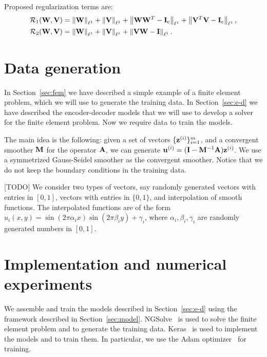 Proposed regularization terms are:
\begin{subequations}
    \begin{align}
        \mathcal{R}_1(\mathbf{W}, \mathbf{V}) &
        = \left\lVert \mathbf{W}  \right\rVert_{\ell^1} + \left\lVert \mathbf{V}  \right\rVert_{\ell^1}
        + \left\lVert \mathbf{W} \mathbf{W}^T - \mathbf{I}_\mathrm{c}  \right\rVert_{\ell^1}
        + \left\lVert \mathbf{V}^T \mathbf{V} - \mathbf{I}_\mathrm{c}  \right\rVert_{\ell^1}, \\
        \mathcal{R}_2(\mathbf{W}, \mathbf{V}) &
        = \left\lVert \mathbf{W}  \right\rVert_{\ell^1} + \left\lVert \mathbf{V}  \right\rVert_{\ell^1}
        + \left\lVert \mathbf{V} \mathbf{W} - \mathbf{I}  \right\rVert_{\ell^1}.
    \end{align}
\end{subequations}

\section{Data generation}

In Section~\ref{sec:fem} we have described a simple example of a finite element problem, which we will use to generate the training data.
In Section~\ref{sec:e-d} we have described the encoder-decoder models that we will use to develop a solver for the finite element problem.
Now we require data to train the models.

The main idea is the following: given a set of vectors \( \{ \mathbf{z}^{(i)} \}_{i=1}^{m} \), and a convergent smoother \( \mathbf{M}\) for the operator \(\mathbf{A}\), we can generate \( \mathbf{u}^{(i)} = (\mathbf{I} - \mathbf{M}^{-1} \mathbf{A}) \mathbf{z}^{(i)} \).
We use a symmetrized Gauss-Seidel smoother as the convergent smoother.
Notice that we do not keep the boundary conditions in the training data.

[TODO]
We consider two types of vectors, say randomly generated vectors with entries in \([0,1]\), vectors with entries in \(\{0,1\}\), and interpolation of smooth functions.
The interpolated functions are of the form \(u_i(x,y) = \sin(2 \pi \alpha_i x) \sin(2 \pi \beta_i y) + \gamma_i\), where \(\alpha_i, \beta_i, \gamma_i\) are randomly generated numbers in \([0,1]\).

\section{Implementation and numerical experiments}

We assemble and train the models described in Section~\ref{sec:e-d} using the framework described in Section~\ref{sec:model}.
NGSolve~\cite{schoberl2014c++} is used to solve the finite element problem and to generate the training data.
Keras~\cite{chollet2015keras} is used to implement the models and to train them.
In particular, we use the Adam optimizer~\cite{kingma2014adam} for training.
